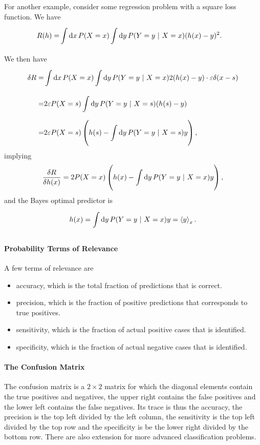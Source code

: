 For another example, consider some regression problem with a square loss function. We have
\begin{align*}
	R(h) =& \int\limits_{}^{}\dd{x}P(X = x)\int\limits_{}^{}\dd{y}P(Y = y\ \vert\  X = x)(h(x) - y)^{2}.
\end{align*}
We then have
\begin{align*}
	\var{R} =& \int\limits_{}^{}\dd{x}P(X = x)\int\limits_{}^{}\dd{y}P(Y = y\ \vert\  X = x)2(h(x) - y)\cdot\varepsilon\delta(x - s) \\
	        =& 2\varepsilon P(X = s)\int\limits_{}^{}\dd{y}P(Y = y\ \vert\  X = s)(h(s) - y) \\
	        =& 2\varepsilon P(X = s)\left(h(s) - \int\limits_{}^{}\dd{y}P(Y = y\ \vert\  X = s)y\right),
\end{align*}
implying
\begin{align*}
	\fdv{R}{h(x)} = 2P(X = x)\left(h(x) - \inte{}{}\dd{y}P(Y = y\given X = x)y\right),
\end{align*}
and the Bayes optimal predictor is
\begin{align*}
	h(x) = \int\limits_{}^{}\dd{y}P(Y = y\ \vert\  X = x)y = \expval{y}_{x}.
\end{align*}

\paragraph{Probability Terms of Relevance}
A few terms of relevance are
\begin{itemize}
	\item accuracy, which is the total fraction of predictions that is correct.
	\item precision, which is the fraction of positive predictions that corresponds to true positives.
	\item sensitivity, which is the fraction of actual positive cases that is identified.
	\item specificity, which is the fraction of actual negative cases that is identified.
\end{itemize}

\paragraph{The Confusion Matrix}
The confusion matrix is a $2\times 2$ matrix for which the diagonal elements contain the true positives and negatives, the upper right contains the false positives and the lower left contains the false negatives. Its trace is thus the accuracy, the precision is the top left divided by the left column, the sensitivity is the top left divided by the top row and the specificity is be the lower right divided by the bottom row. There are also extension for more advanced classification problems.

